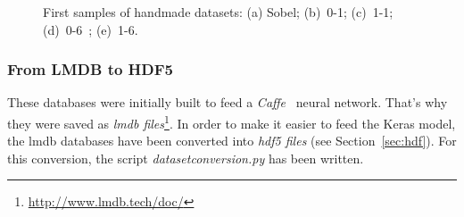 \begin{figure}
\begin{subfigure}{0.5\textwidth}
		\caption{}
	\end{subfigure}
	\caption{First samples of handmade datasets: (a) Sobel; (b)~0-1; (c)~1-1; (d)~0-6~; (e)~1-6.}
	\label{fig:aug_nuria}
\end{figure}

\subsubsection{From LMDB to HDF5} \label{subsubsec:lmdb2hdf5}
These databases were initially built to feed a \emph{Caffe}~\cite{jia2014caffe} neural network. That's why they were saved as \emph{\gls{lmdb} files}\footnote{\url{http://www.lmdb.tech/doc/}}. In order to make it easier to feed the Keras model, the \gls{lmdb} databases have been converted into \emph{\gls{hdf5} files} (see Section~\ref{sec:hdf}). For this conversion, the script \emph{\textit{datasetconversion.py}} has been written.

